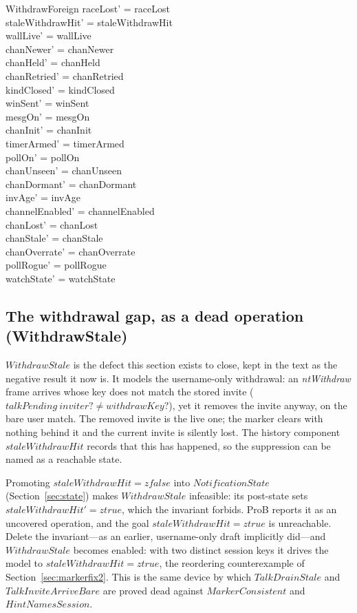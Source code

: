 \documentclass[a4paper,10pt,fleqn]{article}
\begin{document}
\begin{schema}{WithdrawForeign}
  raceLost' = raceLost \\
  staleWithdrawHit' = staleWithdrawHit \\
  wallLive' = wallLive \\
  chanNewer' = chanNewer \\
  chanHeld' = chanHeld \\
  chanRetried' = chanRetried \\
  kindClosed' = kindClosed \\
  winSent' = winSent \\
  mesgOn' = mesgOn \\
  chanInit' = chanInit \\
  timerArmed' = timerArmed \\
  pollOn' = pollOn \\
  chanUnseen' = chanUnseen \\
  chanDormant' = chanDormant \\
  invAge' = invAge \\
  channelEnabled' = channelEnabled \\
  chanLost' = chanLost \\
  chanStale' = chanStale \\
  chanOverrate' = chanOverrate \\
  pollRogue' = pollRogue \\
  watchState' = watchState
\end{schema}

\subsection{The withdrawal gap, as a dead operation (WithdrawStale)}

$WithdrawStale$ is the defect this section exists to close, kept in the text
as the negative result it now is.  It models the username-only withdrawal:
an \emph{ntWithdraw} frame arrives whose key does not match the stored invite
($talkPending~inviter? \neq withdrawKey?$), yet it removes the invite anyway,
on the bare user match.  The removed invite is the live one; the marker
clears with nothing behind it and the current invite is silently lost.  The
history component $staleWithdrawHit$ records that this has happened, so the
suppression can be named as a reachable state.

Promoting $staleWithdrawHit = zfalse$ into $NotificationState$
(Section~\ref{sec:state}) makes $WithdrawStale$ infeasible: its post-state
sets $staleWithdrawHit' = ztrue$, which the invariant forbids.  ProB reports
it as an uncovered operation, and the goal $staleWithdrawHit = ztrue$ is
unreachable.  Delete the invariant---as an earlier, username-only draft
implicitly did---and $WithdrawStale$ becomes enabled: with two distinct
session keys it drives the model to $staleWithdrawHit = ztrue$, the reordering
counterexample of Section~\ref{sec:markerfix2}.  This is the same device by
which $TalkDrainStale$ and $TalkInviteArriveBare$ are proved dead against
$MarkerConsistent$ and $HintNamesSession$.
\end{document}
